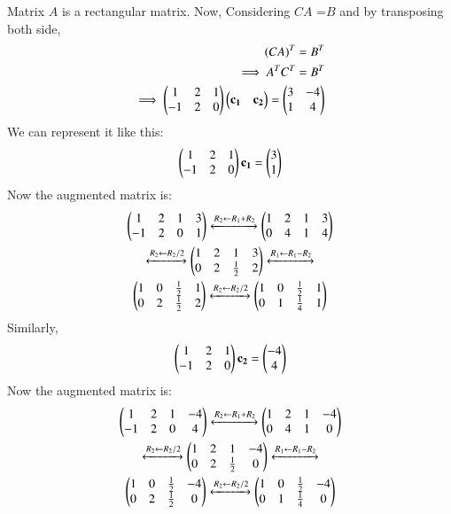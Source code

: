 \documentclass[journal,12pt,twocolumn]{IEEEtran}
\begin{document}
Matrix $A$ is a rectangular matrix.
Now, Considering $CA$ =$B$ and by transposing both side,
\begin{align}
(CA)^T = B^T\\
\implies A^T C^T = B^T\\
\implies \begin{pmatrix}1 & 2 & 1\\-1 & 2 & 0\end{pmatrix} \begin{pmatrix}\mathbf{c_1} & \mathbf{c_2}\end{pmatrix} = \begin{pmatrix}3 & -4\\1 & 4\end{pmatrix}
\end{align}
We can represent it like this:
\begin{align}
\begin{pmatrix}1 & 2 & 1\\-1 & 2 & 0\end{pmatrix} \mathbf{c_1} = \begin{pmatrix}3\\1\end{pmatrix}\\
\end{align}
Now the augmented matrix is:
\begin{multline}
\begin{pmatrix}1 & 2 & 1 & 3\\-1 & 2 & 0 & 1\end{pmatrix}\xleftrightarrow[]{R_2\leftarrow R_1+R_2}\begin{pmatrix}1 & 2 & 1 & 3\\0 & 4 & 1 & 4\end{pmatrix}\\ 
\xleftrightarrow[]{R_2\leftarrow R_2/2}\begin{pmatrix}1 & 2 & 1 & 3\\0 & 2 & \frac{1}{2} & 2\end{pmatrix}\xleftrightarrow[]{R_1\leftarrow R_1-R_2}\\
\begin{pmatrix}1 & 0 & \frac{1}{2} & 1\\0 & 2 & \frac{1}{2} & 2\end{pmatrix}\xleftrightarrow[]{R_2\leftarrow R_2/2}\begin{pmatrix}1 & 0 & \frac{1}{2} & 1\\0 & 1 & \frac{1}{4} & 1\end{pmatrix}
\label{eqn:1}
\end{multline}
Similarly,
\begin{align}
\begin{pmatrix}1 & 2 & 1\\-1 & 2 & 0\end{pmatrix} \mathbf{c_2} = \begin{pmatrix}-4\\4\end{pmatrix}\\
\end{align}
Now the augmented matrix is:
\begin{multline}
\begin{pmatrix}1 & 2 & 1 & -4\\-1 & 2 & 0 & 4\end{pmatrix}\xleftrightarrow[]{R_2\leftarrow R_1+R_2}\begin{pmatrix}1 & 2 & 1 & -4\\0 & 4 & 1 & 0\end{pmatrix}\\ 
\xleftrightarrow[]{R_2\leftarrow R_2/2}\begin{pmatrix}1 & 2 & 1 & -4\\0 & 2 & \frac{1}{2} & 0\end{pmatrix}\xleftrightarrow[]{R_1\leftarrow R_1-R_2}\\
\begin{pmatrix}1 & 0 & \frac{1}{2} & -4\\0 & 2 & \frac{1}{2} & 0\end{pmatrix}\xleftrightarrow[]{R_2\leftarrow R_2/2}\begin{pmatrix}1 & 0 & \frac{1}{2} & -4\\0 & 1 & \frac{1}{4} & 0\end{pmatrix}
\label{eqn:2}
\end{multline}
\end{document}
